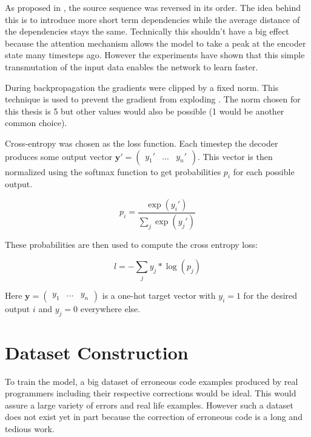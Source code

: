  As proposed in \cite{seq2seq}, the source sequence was reversed in its order. The idea behind this is to introduce more short term dependencies while the average distance of the dependencies stays the same. Technically this shouldn't have a big effect because the attention mechanism allows the model to take a peak at the encoder state many timesteps ago. However the experiments have shown that this simple transmutation of the input data enables the network to learn faster.

 During backpropagation the gradients were clipped by a fixed norm. This technique is used to prevent the gradient from exploding \cite{gradient_clipping}. The norm chosen for this thesis is 5 but other values would also be possible (1 would be another common choice).

 Cross-entropy was chosen as the loss function. Each timestep the decoder produces some output vector \(\mathbf{y}' = \begin{pmatrix} y_1' & ... & y_n'\end{pmatrix}\). This vector is then normalized using the softmax function to get probabilities \(p_i\) for each possible output.

 \begin{equation*}
   p_i = \frac
             {\exp(y_i')}
             {\sum_{j} \exp(y_j')}
 \end{equation*}

 These probabilities are then used to compute the cross entropy loss:

 \begin{equation*}
   l = - \sum_{j} y_j * \log(p_j)
 \end{equation*}

 Here \(\mathbf{y} = \begin{pmatrix} y_1 & ... & y_n \end{pmatrix}\) is a one-hot target vector with \(y_i = 1\) for the desired output \(i\) and \(y_j = 0\) everywhere else.

\section{Dataset Construction}

To train the model, a big dataset of erroneous code examples produced by real programmers including their respective corrections would be ideal. This would assure a large variety of errors and real life examples. However such a dataset does not exist yet in part because the correction of erroneous code is a long and tedious work.

